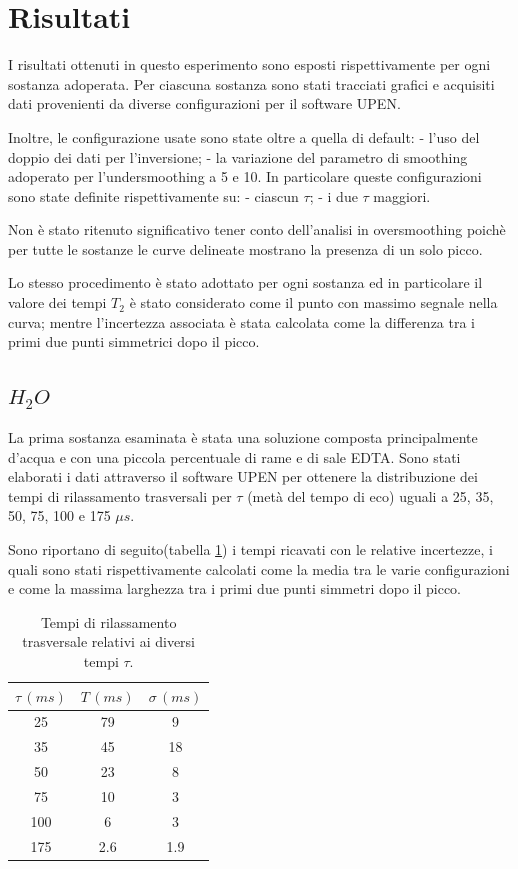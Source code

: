 \section*{Risultati}
I risultati ottenuti in questo esperimento sono esposti rispettivamente per ogni sostanza adoperata. 
Per ciascuna sostanza sono stati tracciati grafici e acquisiti dati provenienti da diverse configurazioni per il software UPEN. 

Inoltre, le configurazione usate sono state oltre a quella di default:  - l'uso del doppio dei dati per l'inversione; - la variazione del parametro di smoothing adoperato per l'undersmoothing a 5 e 10.
In particolare queste configurazioni sono state definite rispettivamente su: - ciascun $\tau$; - i due $\tau$ maggiori.

Non è stato ritenuto significativo tener conto dell'analisi in oversmoothing poichè per tutte le sostanze le curve delineate mostrano la presenza di un solo picco.

Lo stesso procedimento è stato adottato per ogni sostanza ed in particolare il valore dei tempi $T_2$ è stato considerato come il punto con massimo segnale nella curva; mentre l'incertezza associata è stata calcolata come la differenza tra i primi due punti simmetrici dopo il picco.

\subsection*{$H_2O$}
La prima sostanza esaminata è stata una soluzione composta principalmente d'acqua e con una piccola percentuale di rame e di sale EDTA.
Sono stati elaborati i dati attraverso il software UPEN per ottenere la distribuzione dei tempi di rilassamento trasversali per $\tau$ (metà del tempo di eco) uguali a 25, 35, 50, 75, 100 e 175 ${\mu}s$.

Sono riportano di seguito(tabella \ref{tab:T_h2o}) i tempi ricavati con le relative incertezze, i quali sono stati rispettivamente calcolati come la media tra le varie configurazioni e come la massima larghezza tra i primi due punti simmetri dopo il picco.

\begin{table}[h!]
    \begin{center}
    \begin{tabular}{c c c}
    \toprule
    	${\tau}\,(ms)$ & $T\,(ms)$ & ${\sigma}\,(ms)$ \\
    \midrule
	25 & 79 & 9 \\
	35 & 45 & 18 \\
	50 & 23 & 8 \\
	75 & 10 & 3 \\
	100 & 6 & 3 \\
	175 & 2.6 & 1.9\\
    \bottomrule
    \end{tabular}
    \caption{Tempi di rilassamento trasversale relativi ai diversi tempi $\tau$.}
    \label{tab:T_h2o}
    \end{center}
\end{table}

